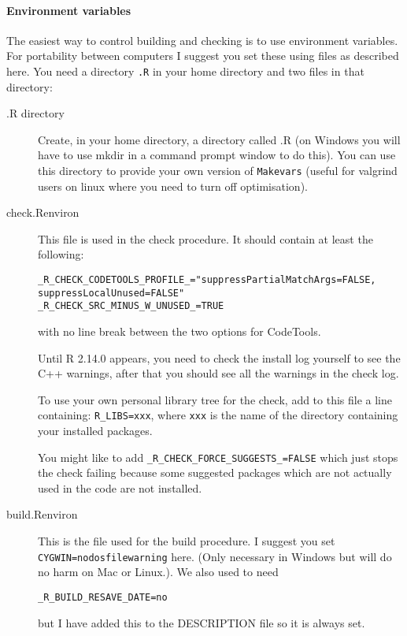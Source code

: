 \documentclass[12pt, a4paper]{article}
\renewcommand{\=}{\,=\,}
\newcommand{\+}{\,+\,}
\begin{document}
\paragraph{Environment variables}
 \label{below}
 The easiest way to control building and checking is to use environment
 variables. For portability between computers I suggest you set these using
 files as described here. You need a directory \verb|.R| in your home directory
 and two files in that directory:
\begin{description}
\item[.R directory] Create, in your home directory, a directory called .R (on
  Windows you will have to use mkdir in a command prompt window to do this). You
  can use this directory to provide your own version of \verb|Makevars|
(useful
  for \textsf{valgrind} users on linux where you need to turn off optimisation).
\item[check.Renviron] This file is used in the check procedure. It should
 contain at least the following:
{\small
\begin{verbatim}
_R_CHECK_CODETOOLS_PROFILE_="suppressPartialMatchArgs=FALSE,
suppressLocalUnused=FALSE"
_R_CHECK_SRC_MINUS_W_UNUSED_=TRUE
\end{verbatim}
}
with no line break between the two options for CodeTools.

Until R 2.14.0 appears, you need to check the install log yourself to see the
C++ warnings, after that you should see all the warnings in the check log.

To use your own personal library tree for the check, add to this file a line
containing: \verb|R_LIBS=xxx|, where \verb|xxx| is the name of the directory
containing your installed packages.

You might like to add
\verb|_R_CHECK_FORCE_SUGGESTS_=FALSE| which just stops the check failing because
some suggested packages which are not actually used in the code are not
installed.
\item[build.Renviron] This is the file used for the build procedure.  I suggest
  you set \verb|CYGWIN=nodosfilewarning| here. (Only necessary in Windows but
  will do no harm on Mac or Linux.). We also used to need
\begin{verbatim}
_R_BUILD_RESAVE_DATE=no
\end{verbatim}
but I have added this to the DESCRIPTION file so it is always set.
\end{description}
\end{document}
